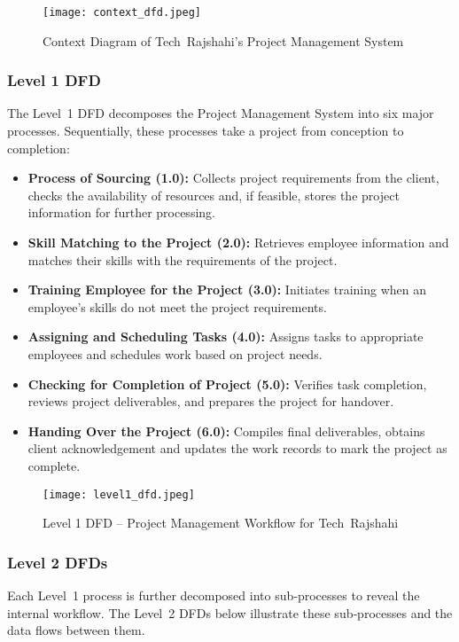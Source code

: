\documentclass[12pt,a4paper]{article}
\begin{document}
\begin{figure}[H]
    \centering
    \texttt{[image: context\_dfd.jpeg]}
    \caption{Context Diagram of Tech Rajshahi's Project Management System}
    \label{fig:context_dfd}
\end{figure}

\subsubsection{Level 1 DFD}
The Level~1 DFD decomposes the Project Management System into six major processes.  Sequentially, these processes take a project from conception to completion:

\begin{itemize}
    \item \textbf{Process of Sourcing (1.0):} Collects project requirements from the client, checks the availability of resources and, if feasible, stores the project information for further processing.
    \item \textbf{Skill Matching to the Project (2.0):} Retrieves employee information and matches their skills with the requirements of the project.
    \item \textbf{Training Employee for the Project (3.0):} Initiates training when an employee’s skills do not meet the project requirements.
    \item \textbf{Assigning and Scheduling Tasks (4.0):} Assigns tasks to appropriate employees and schedules work based on project needs.
    \item \textbf{Checking for Completion of Project (5.0):} Verifies task completion, reviews project deliverables, and prepares the project for handover.
    \item \textbf{Handing Over the Project (6.0):} Compiles final deliverables, obtains client acknowledgement and updates the work records to mark the project as complete.
\end{itemize}

\begin{figure}[H]
    \centering
    \texttt{[image: level1\_dfd.jpeg]}
    \caption{Level 1 DFD – Project Management Workflow for Tech Rajshahi}
    \label{fig:level1_dfd}
\end{figure}

\subsubsection{Level 2 DFDs}
\noindent
Each Level~1 process is further decomposed into sub‑processes to reveal the internal workflow.  The Level~2 DFDs below illustrate these sub‑processes and the data flows between them.
\end{document}
